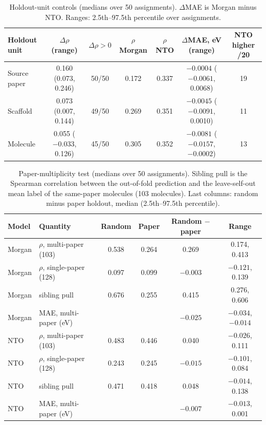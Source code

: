 \documentclass[final,3p,times,twocolumn]{elsarticle}
\begin{document}
\begin{table}[t]
  \centering
  \caption{Holdout-unit controls (medians over \num{50} assignments). $\Delta$MAE is Morgan minus
    NTO. Ranges: 2.5th--97.5th percentile over assignments.}
  \label{tab:a017_full}
  \footnotesize\setlength{\tabcolsep}{3pt}
  \begin{tabular}{lcccccc}
    \toprule
    Holdout unit & $\Delta\rho$ (range) & $\Delta\rho>0$ & $\rho$ Morgan & $\rho$ NTO & $\Delta$MAE, eV (range) & NTO higher /20 \\
    \midrule
    Source paper & 0.160 (0.073, 0.246) & 50/50 & 0.172 & 0.337 & $-0.0004$ ($-0.0061$, 0.0068) & 19 \\
    Scaffold     & 0.073 (0.007, 0.144) & 49/50 & 0.269 & 0.351 & $-0.0045$ ($-0.0091$, 0.0010) & 11 \\
    Molecule     & 0.055 ($-0.033$, 0.126) & 45/50 & 0.305 & 0.352 & $-0.0081$ ($-0.0157$, $-0.0002$) & 13 \\
    \bottomrule
  \end{tabular}
\end{table}

\begin{table}[t]
  \centering
  \caption{Paper-multiplicity test (medians over \num{50} assignments). Sibling pull is the Spearman
    correlation between the out-of-fold prediction and the leave-self-out mean label of the
    same-paper molecules (\num{103} molecules). Last columns: random minus paper holdout, median
    (2.5th--97.5th percentile).}
  \label{tab:a019}
  \footnotesize\setlength{\tabcolsep}{3pt}
  \begin{tabular}{llcccc}
    \toprule
    Model & Quantity & Random & Paper & Random $-$ paper & Range \\
    \midrule
    Morgan & $\rho$, multi-paper (\num{103}) & 0.538 & 0.264 & 0.269 & 0.174, 0.413 \\
    Morgan & $\rho$, single-paper (\num{128}) & 0.097 & 0.099 & $-0.003$ & $-0.121$, 0.139 \\
    Morgan & sibling pull & 0.676 & 0.255 & 0.415 & 0.276, 0.606 \\
    Morgan & MAE, multi-paper (eV) & & & $-0.025$ & $-0.034$, $-0.014$ \\
    NTO    & $\rho$, multi-paper (\num{103}) & 0.483 & 0.446 & 0.040 & $-0.026$, 0.111 \\
    NTO    & $\rho$, single-paper (\num{128}) & 0.243 & 0.245 & $-0.015$ & $-0.101$, 0.084 \\
    NTO    & sibling pull & 0.471 & 0.418 & 0.048 & $-0.014$, 0.138 \\
    NTO    & MAE, multi-paper (eV) & & & $-0.007$ & $-0.013$, 0.001 \\
    \bottomrule
  \end{tabular}
\end{table}
\end{document}
